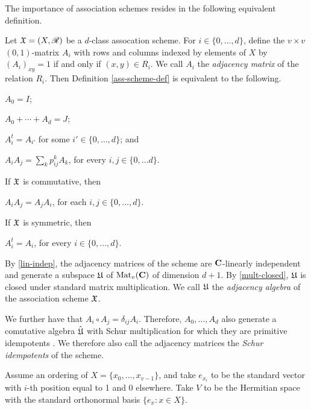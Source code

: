 \documentclass[../../../main]{subfiles}
\begin{document}
 The importance of association schemes resides in the following equivalent definition.
 
 \begin{defin}
  Let $\mathfrak{X}=(X,\mathscr{R})$ be a $d$-class assocation scheme. For $i \in \{0, \dots, d\}$, define the $v \times v$ $(0,1)$-matrix $A_i$ with rows and columns indexed by elements of $X$ by $(A_i)_{xy} = 1$ if and only if $(x,y) \in R_i$. We call $A_i$ the {\it adjacency matrix} of the relation $R_i$. Then Definition \ref{ass-scheme-def} is equivalent to the following.
  \begin{defenum}
   \item\label{id-mat} $A_0=I$;
   \item\label{lin-indep} $A_0 + \cdots + A_d=J$;
   \item\label{trans-closed} $A_i^t=A_{i'}$ for some $i' \in \{0, \dots, d\}$; and
   \item\label{mult-closed} $A_iA_j=\sum_k p_{ij}^kA_k$, for every $i,j \in \{0, \dots d\}$.
  \end{defenum}
  If $\mathfrak{X}$ is commutative, then
  \begin{defenum}[resume]
   \item\label{commutative-scheme} $A_iA_j=A_jA_i$, for each $i,j \in \{0, \dots, d\}$.
  \end{defenum}
  If $\mathfrak{X}$ is symmetric, then
  \begin{defenum}[resume]
   \item\label{symmetric-scheme} $A_i^t=A_i$, for every $i \in \{0, \dots, d\}$.
  \end{defenum}
  By \ref{lin-indep}, the adjacency matrices of the scheme are $\mathbf{C}$-linearly independent and generate a subspace $\mathfrak{U}$ of $\text{Mat}_v(\mathbf{C})$ of dimension $d+1$. By \ref{mult-closed}, $\mathfrak{U}$ is closed under standard matrix multiplication. We call $\mathfrak{U}$ the {\it adjacency algebra} of the association scheme $\mathfrak{X}$.
  
  We further have that $A_i \circ A_j = \delta_{ij}A_i$. Therefore, $A_0, \dots,
  A_d$ also generate a comutative algebra $\hat {\mathfrak{U}}$ with Schur multiplication
  for which they are primitive idempotents . We therefore also call the adjacency matrices the {\it Schur idempotents} of the scheme.
 \end{defin}
 
 Assume an ordering of $X=\{x_0, \dots, x_{v-1}\}$, and take $e_{x_i}$ to be the standard vector with $i$-th position equal to 1 and 0 elsewhere. Take $V$ to be the Hermitian space with the standard orthonormal basis $\{e_x : x \in X\}$. 
 
\end{document}
